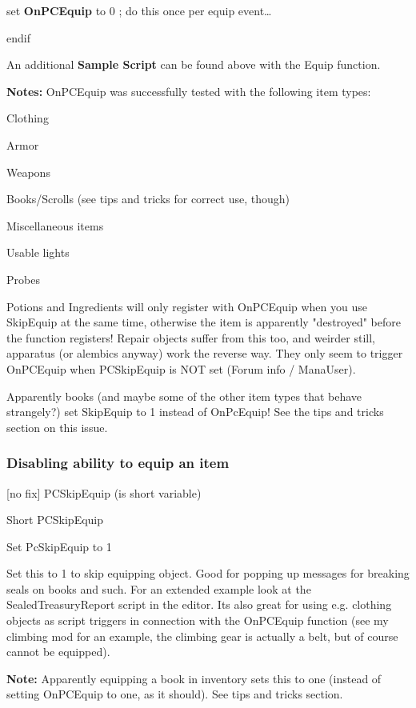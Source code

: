 \documentclass[
]{article}
\begin{document}
set \textbf{OnPCEquip} to 0 ; do this once per equip event\ldots{}

endif

An additional \textbf{Sample Script} can be found above with the Equip
function.

\textbf{Notes:} OnPCEquip was successfully tested with the following
item types:

Clothing

Armor

Weapons

Books/Scrolls (see tips and tricks for correct use, though)

Miscellaneous items

Usable lights

Probes

Potions and Ingredients will only register with OnPCEquip when you use
SkipEquip at the same time, otherwise the item is apparently "destroyed"
before the function registers! Repair objects suffer from this too, and
weirder still, apparatus (or alembics anyway) work the reverse way. They
only seem to trigger OnPCEquip when PCSkipEquip is NOT set (Forum info /
ManaUser).

Apparently books (and maybe some of the other item types that behave
strangely?) set SkipEquip to 1 instead of OnPcEquip! See the tips and
tricks section on this issue.

\hypertarget{disabling-ability-to-equip-an-item}{%
\subsubsection{Disabling ability to equip an
item}\label{disabling-ability-to-equip-an-item}}

{[}no fix{]} PCSkipEquip (is short variable)

Short PCSkipEquip

Set PcSkipEquip to 1

Set this to 1 to skip equipping object. Good for popping up messages for
breaking seals on books and such. For an extended example look at the
SealedTreasuryReport script in the editor. Its also great for using e.g.
clothing objects as script triggers in connection with the OnPCEquip
function (see my climbing mod for an example, the climbing gear is
actually a belt, but of course cannot be equipped).

\textbf{Note:} Apparently equipping a book in inventory sets this to one
(instead of setting OnPCEquip to one, as it should). See tips and tricks
section.
\end{document}
